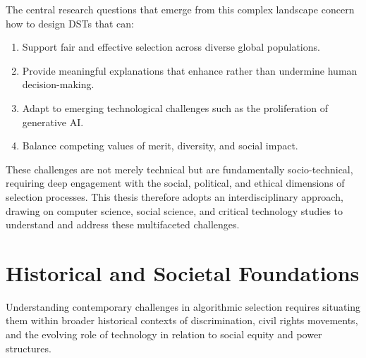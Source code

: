 The central research questions that emerge from this complex landscape concern how to design DSTs that can:
\begin{enumerate}
  \item Support fair and effective selection across diverse global populations.
  \item Provide meaningful explanations that enhance rather than undermine human decision-making.
  \item Adapt to emerging technological challenges such as the proliferation of generative AI.
  \item Balance competing values of merit, diversity, and social impact.
\end{enumerate}

These challenges are not merely technical but are fundamentally socio-technical, requiring deep engagement with the social, political, and ethical dimensions of selection processes. This thesis therefore adopts an interdisciplinary approach, drawing on computer science, social science, and critical technology studies to understand and address these multifaceted challenges.

\section{Historical and Societal Foundations}\label{sec:context_historical_societal}
Understanding contemporary challenges in algorithmic selection requires situating them within broader historical contexts of discrimination, civil rights movements, and the evolving role of technology in relation to social equity and power structures.

